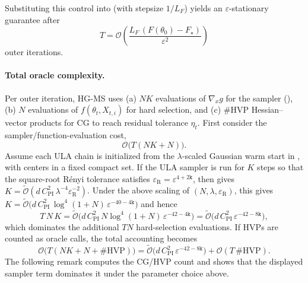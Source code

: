 \documentclass{article}
\theoremstyle{normaltheorem}
\newcommand{\dimk}{\texttt{k}}
\begin{document}
Substituting this control into  (with stepsize $1/L_F$) yields an $\varepsilon$-stationary guarantee after
\[
T=\mathcal{O}\!\left(\frac{L_F\,(F(\theta_0)-F_\star)}{\varepsilon^2}\right)
\]
outer iterations.

\paragraph{Total oracle complexity.}
Per outer iteration, \textsc{HG-MS} uses (a) $NK$ evaluations of $\nabla_x g$ for the sampler (),
(b) $N$ evaluations of $f(\theta_t,X_{t,i})$ for hard selection, and (c) $\#\mathrm{HVP}$ Hessian--vector products for CG to reach residual tolerance $\eta_t$.
First consider the sampler/function-evaluation cost,
\[
\mathcal{O}\big(T(NK+N)\big).
\]
Assume each ULA chain is initialized from the \(\lambda\)-scaled Gaussian warm start in
, with centers in a fixed compact set. If the ULA sampler is run for $K$ steps so that the
square-root R\'enyi tolerance satisfies
$\varepsilon_{\mathrm{R}}=\varepsilon^{4+2\dimk}$, then  gives
$K=\widetilde{\mathcal{O}}(d\,C_{\mathrm{PI}}^{2}\,\lambda^{-4}\varepsilon_{\mathrm{R}}^{-2})$.
Under the above scaling of \((N,\lambda,\varepsilon_{\mathrm R})\), this gives
$K=\widetilde{\mathcal{O}}\!\big(d\,C_{\mathrm{PI}}^{2}\,\log^{4}(1+N)\,\varepsilon^{-40-4\dimk}\big)$ and hence
\[
T\,N\,K
=\widetilde{\mathcal{O}}\!\big(d\,C_{\mathrm{PI}}^{2}\,N\log^{4}(1+N)\,\varepsilon^{-42-4\dimk}\big)
=\widetilde{\mathcal{O}}\!\big(d\,C_{\mathrm{PI}}^{2}\,\varepsilon^{-42-8\dimk}\big),
\]
which dominates the additional \(TN\) hard-selection evaluations.
If HVPs are counted as oracle calls, the total accounting becomes
\[
\mathcal{O}\big(T(NK+N+\#\mathrm{HVP})\big)
=
\widetilde{\mathcal{O}}\!\big(d\,C_{\mathrm{PI}}^{2}\,\varepsilon^{-42-8\dimk}\big)
+\mathcal{O}(T\,\#\mathrm{HVP}).
\]
The following remark computes the CG/HVP count and shows that the displayed sampler term dominates it under the parameter choice above.
\end{document}
